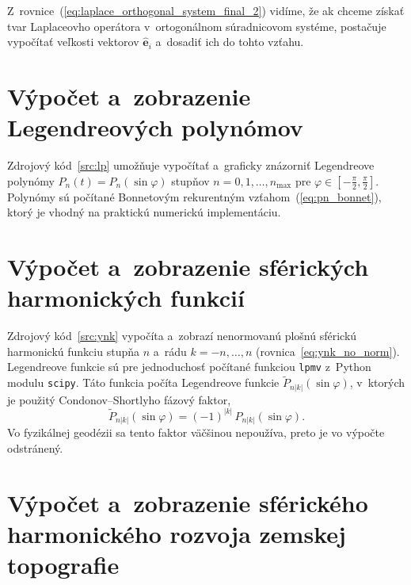 \documentclass[a4paper,12pt]{book}
\let\vec\mathbf
\begin{document}
Z~rovnice~(\ref{eq:laplace_orthogonal_system_final_2}) vidíme, že ak chceme 
získať tvar Laplaceovho operátora v~ortogonálnom súradnicovom systéme, 
postačuje vypočítať veľkosti vektorov $\hat{\vec e}_i$ a~dosadiť ich do tohto 
vzťahu.




\chapter{Výpočet a~zobrazenie Legendreových polynómov}
\label{app:lp}

Zdrojový kód~\ref{src:lp} umožňuje vypočítať a~graficky znázorniť Legendreove
polynómy $P_n(t) = P_n(\sin\varphi)$ stupňov $n = 0, 1, \dots, n_{\max}$ pre
$\varphi \in [-\frac{\pi}{2}, \frac{\pi}{2}]$.  Polynómy sú počítané Bonnetovým
rekurentným vzťahom~(\ref{eq:pn_bonnet}), ktorý je vhodný na praktickú
numerickú implementáciu.








\chapter{Výpočet a~zobrazenie sférických harmonických funkcií}
\label{app:sh}

Zdrojový kód~\ref{src:ynk} vypočíta a~zobrazí nenormovanú plošnú sférickú
harmonickú funkciu stupňa $n$ a~rádu $k = -n, \dots, n$
(rovnica~\ref{eq:ynk_no_norm}).  Legendreove funkcie sú pre jednoduchosť
počítané funkciou \texttt{lpmv} z~Python modulu \texttt{scipy}.  Táto funkcia
počíta Legendreove funkcie $\tilde{P}_{n|k|}(\sin\varphi)$, v~ktorých je
použitý Condonov--Shortlyho fázový faktor,
%
\begin{equation}
\tilde{P}_{n|k|}(\sin\varphi) = (-1)^{|k|} \, P_{n|k|}(\sin\varphi){.}
\end{equation}
%
Vo fyzikálnej geodézii sa tento faktor väčšinou nepoužíva, preto je vo výpočte
odstránený.









\chapter{Výpočet a~zobrazenie sférického harmonického rozvoja zemskej
topografie}
\label{app:shs_topography}
\end{document}

